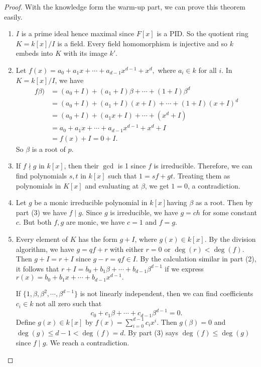 \documentclass[12pt]{report}
\theoremstyle{definition}
\begin{document}
\begin{proof}
	With the knowledge form the warm-up part, we can prove this theorem easily.
	\begin{enumerate}
		\item  $I$ is a prime ideal hence maximal since $F[x]$ is a PID. So the quotient ring $K=k[x]/I$ is a field. Every field homomorphism is injective and so $k$ embeds into $K$ with its image $k'$.
		\item Let $f(x)= a_0+a_1x+\cdots+a_{d-1}x^{d-1}+x^d,$ where $a_i\in k$ for all $i$. In $K=k[x]/I$, we have \begin{align*}
			      f\beta) & = (a_0+I)+(a_1+I)\beta+\cdots+(1+I)\beta^d \\
			              & = (a_0+I)+(a_1+I)(x+I)+\cdots+(1+I)(x+I)^d \\
			              & = (a_0+I)+(a_1x+I)+\cdots+(x^d +I)         \\
			              & = a_0+a_1x+\cdots+a_{d-1}x^{d-1}+x^d +I    \\
			              & = f(x)+I = 0+I.
		      \end{align*} So $\beta$ is a root of $p$.
		\item If $f\nmid g$ in $k[x]$, then their $\gcd$ is 1 since $f$ is irreducible. Therefore, we can find polynomials $s,t$ in $k[x]$ such that $1=sf+gt$. Treating them as polynomials in $K[x]$ and evaluating at $\beta$, we get $1=0$, a contradiction.
		\item Let $g$ be a monic irreducible polynomial in $k[x]$having $\beta$ as a root. Then by part (3) we have $f\mid g$. Since $g$ is irreducible, we have $g=ch$ for some constant $c$. But both $f,g$ are monic, we have $c=1$ and $f=g$.
		\item Every element of $K$ has the form $g+I$, where $g(x)\in k[x]$. By the division algorithm, we have $g=qf+r$ with either $r=0$ or $\deg(r)<\deg(f)$. Then $g+I=r+I$ since $g-r=qf\in I$. By the calculation similar in part (2), it follows that $r+I = b_0+b_1\beta+\cdots+ b_{d-1} \beta^{d-1}$ if we express $r(x)= b_0+b_1 x+\cdots+b_{d-1}x^{d-1}.$

		      If $\{1,\beta,\beta^2,\cdots,\beta^{d-1}\}$ is not linearly independent, then we can find coefficients $c_i\in k$ not all zero such that $$c_0+c_1\beta+\cdots+c_{d-1}\beta^{d-1}=0.$$ Define $g(x)\in k[x]$ by $f(x)=\sum_{i=0}^{d-1}c_ix^i$. Then $g(\beta)=0$ and $\deg(g)\leq d-1 <\deg(f)=d$. By part (3) says $\deg(f)\leq \deg(g)$ since $f\mid g$. We reach a contradiction.
	\end{enumerate}
\end{proof}
\end{document}
